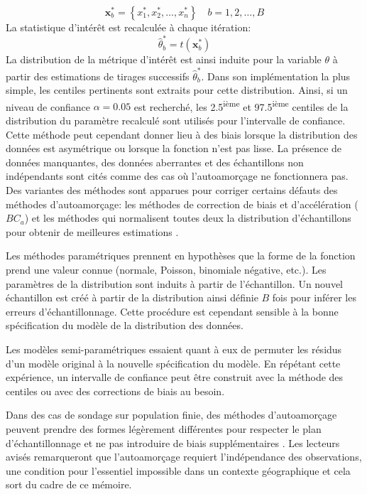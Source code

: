             \begin{equation}
                \mathbf{x}^*_b = \left\{ x_1^*,x_2^*,\ldots,x_n^*\right\} \quad b = 1,2,\ldots,B
            \end{equation}
            La statistique d'intérêt est recalculée à chaque itération:
            \begin{equation}
                \hat\theta^*_b = t(\mathbf{x}^*_b)
            \end{equation}
            La  distribution de la métrique d'intérêt est ainsi induite pour la variable $\theta$ à partir des estimations de tirages successifs $\hat\theta^*_b$. Dans son implémentation la plus simple, les centiles pertinents sont extraits pour cette distribution. Ainsi, si un niveau de confiance $\alpha=0.05$ est recherché, les 2.5\textsuperscript{ième} et 97.5\textsuperscript{ième} centiles de la distribution du paramètre recalculé sont utilisés pour l'intervalle de confiance. Cette méthode peut cependant donner lieu à des biais lorsque la distribution des données est asymétrique ou lorsque la fonction n'est pas lisse. La présence de données manquantes, des données aberrantes et des échantillons non indépendants sont cités comme des cas où l'autoamorçage ne fonctionnera pas\parencite{davison_bootstrap_1999}. Des variantes des méthodes sont apparues pour corriger certains défauts des méthodes d'autoamorçage: les méthodes de correction de biais et d'accélération ($BC_a$) et les méthodes \fg{} qui normalisent toutes deux la distribution d'échantillons pour obtenir de meilleures estimations \parencite{diciccio_bootstrap_1996}. \par
            Les méthodes paramétriques prennent en hypothèses que la forme de la fonction prend une valeur connue (normale, Poisson, binomiale négative, etc.). Les paramètres de la distribution sont induits à partir de l'échantillon.  Un nouvel échantillon est créé à partir de la distribution ainsi définie $B$ fois pour inférer les erreurs d'échantillonnage. Cette procédure est cependant sensible à la bonne spécification du modèle de la distribution des données. \par
            Les modèles semi-paramétriques essaient quant à eux de permuter les résidus d'un modèle original à la nouvelle spécification du modèle. En répétant cette expérience, un intervalle de confiance peut être construit avec la méthode des centiles ou avec des corrections de biais au besoin. \par
            Dans des cas de sondage sur population finie, des méthodes d'autoamorçage peuvent prendre des formes légèrement différentes pour respecter le plan d'échantillonnage et ne pas introduire de biais supplémentaires \parencite{mashreghi_survey_2016}. Les lecteurs avisés remarqueront que l'autoamorçage requiert l'indépendance des observations, une condition pour l'essentiel impossible dans un contexte géographique \parencite{castillo-paez_nonparametric_2019} et cela sort du cadre de ce mémoire.


